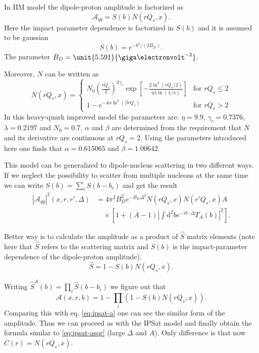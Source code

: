 \documentclass[a4paper,12pt]{article}
\newcommand{\der}{\mathrm{d}}
\newcommand{\A}{\mathcal{A}}
\begin{document}
In IIM model the dipole-proton amplitude is factorized as
\begin{equation}
	\label{eq:iim-a}
	\A_{q\bar q} = S(b) N(rQ_s,x).
\end{equation}
Here the impact parameter dependence is factorized in $S(b)$ and it is assumed to be gaussian
\begin{equation}
	S(b) = e^{-b^2/(2B_D)}.
\end{equation}
The parameter $B_D = \unit{5.591}{\giga\electronvolt^{-2}}$.

Moreover, $N$ can be written as
\begin{equation}
N(rQ_s,x) = \begin{cases}
	N_0\left( \frac{rQ_s}{2} \right)^{2\gamma_c} \exp \left[ -\frac{2 \ln^2 (rQ_s/2) }{\eta \lambda \ln (1/x)} \right] & \text{for } rQ_s \leq 2  \\
	1-e^{-4\alpha \ln^2 (\beta rQ_s)} & \text{for } rQ_s > 2	
	\end{cases}
\end{equation}
In this heavy-quark improved model the parameters are: $\eta = 9.9$, $\gamma_c = 0.7376$, $\lambda=0.2197$ and $N_0 = 0.7$. $\alpha$ and $\beta$ are determined from the requirement that $N$ and its derivative are continuous at $rQ_s=2$. Using the parameters introduced here one finds that $\alpha = 0.615065$ and $\beta = 1.00642$.

This model can be generalized to dipole-nucleus scattering in two different ways. If we neglect the possibility to scatter from multiple nucleons at the same time we can write $S(b) = \sum_i S(b-b_i)$ and get the result
\begin{equation}
\begin{split}
	|\A_{q\bar q}|^2(x,r,r',\Delta) &= 4\pi^2B_D^2 e^{-B_D \Delta^2} N(rQ_s,x)N(r'Q_s,x) A \\
	&\quad \times \left[1 + (A-1) \left| \int \der^2 b e^{-ib \cdot \Delta} T_A(b) \right|^2 \right] . 
\end{split}
\end{equation}

Better way is to calculate the amplitude as a product of $\hat S$ matrix elements (note here that $\hat S$ refers to the scattering matrix and $S(b)$ is the impact-parameter dependence of the dipole-proton amplitude). 
\begin{equation}
	\hat S = 1-S(b)N(rQ_s,x).
\end{equation}

Writing $\hat S^A(b) = \prod_i \hat S(b-b_i)$ we figure out that
\begin{equation}
	\A(x,r,b) = 1 - \prod_i \left( 1-S(b)N(rQ_s,x) \right).
\end{equation}
Comparing this with eq. \eqref{eq:ipsat-a} one can see the similar form of the amplitude. Thus we can proceed as with the IPSat model and finally obtain the formula similar to \eqref{eq:ipsat-asqr} (large $\Delta$ and $A$). Only difference is that now $C(r)=N(rQ_s,x)$.
\end{document}
